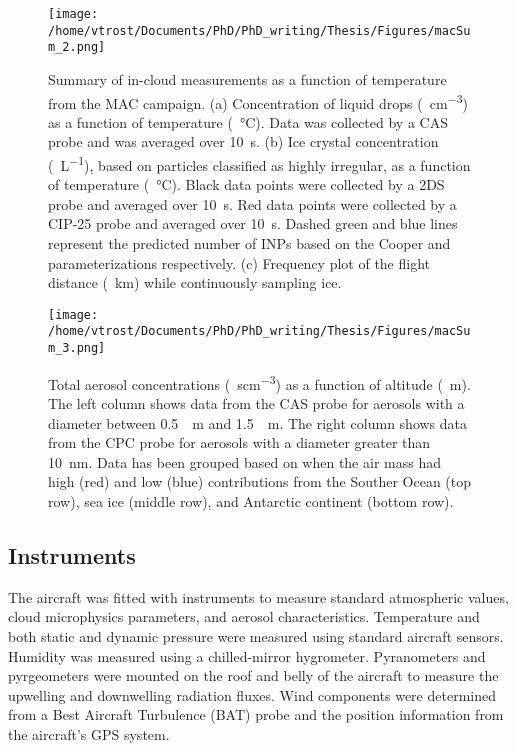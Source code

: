\begin{figure}[H]
	\centering
	\texttt{[image: /home/vtrost/Documents/PhD/PhD\_writing/Thesis/Figures/macSum\_2.png]}
	\caption{Summary of in-cloud measurements as a function of temperature from the MAC campaign. (a) Concentration of liquid drops (\SI{}{cm^{-3}}) as a function of temperature (\SI{}{\degreeCelsius}). Data was collected by a CAS probe and was averaged over \SI{10}{s}. (b) Ice crystal concentration (\SI{}{L^{-1}}), based on particles classified as highly irregular, as a function of temperature (\SI{}{\degreeCelsius}). Black data points were collected by a 2DS probe and averaged over \SI{10}{s}. Red data points were collected by a CIP-25 probe and averaged over \SI{10}{s}. Dashed green and blue lines represent the predicted number of INPs based on the Cooper and \citep{demo2010} parameterizations respectively. (c) Frequency plot of the flight distance (\SI{}{km}) while continuously sampling ice. \citep[][Figure 4]{oshea2017}}
	\label{fig:macSum_2}
\end{figure}

\begin{figure}[H]
	\centering
	\texttt{[image: /home/vtrost/Documents/PhD/PhD\_writing/Thesis/Figures/macSum\_3.png]}
	\caption{Total aerosol concentrations (\SI{}{scm^{-3}}) as a function of altitude (\SI{}{m}). The left column shows data from the CAS probe for aerosols with a diameter between \SI{0.5}{\mu m} and \SI{1.5}{\mu m}. The right column shows data from the CPC probe for aerosols with a diameter greater than \SI{10}{nm}. Data has been grouped based on when the air mass had high (red) and low (blue) contributions from the Souther Ocean (top row), sea ice (middle row), and Antarctic continent (bottom row). \citep[][Figure 12]{oshea2017}}
	\label{fig:macSum_3}
\end{figure}


\subsection{Instruments} \label{sec:instruments}
The aircraft was fitted with instruments to measure standard atmospheric values, cloud microphysics parameters, and aerosol characteristics. Temperature and both static and dynamic pressure were measured using standard aircraft sensors. Humidity was measured using a chilled-mirror hygrometer. Pyranometers and pyrgeometers were mounted on the roof and belly of the aircraft to measure the upwelling and downwelling radiation fluxes. Wind components were determined from a Best Aircraft Turbulence (BAT) probe and the position information from the aircraft's GPS system. \citep{oshea2017}

